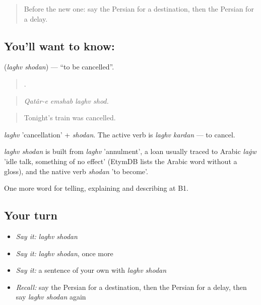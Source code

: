 \label{lesson:FA-C430-laghv-shodan}



\begin{quote}
Before the new one: say the Persian for a destination, then the Persian for a delay.
\end{quote}

\subsection*{You'll want to know:  }
\textbf{ } (\emph{laghv shodan}) — \textquotedblleft{}to be cancelled\textquotedblright{}.

\begin{quote}
   .
\end{quote}

\begin{quote}
\emph{Qatâr-e emshab laghv shod.}
\end{quote}

\begin{quote}
Tonight's train was cancelled.
\end{quote}

\emph{laghv} 'cancellation' + \emph{shodan}. The active verb is \emph{laghv kardan} — to cancel.

\begin{cousinweb}
\emph{laghv shodan} is built from \emph{laghv} 'annulment', a loan usually traced to Arabic \emph{laġw} 'idle talk, something of no effect' (EtymDB lists the Arabic word without a gloss), and the native verb \emph{shodan} 'to become'.
\end{cousinweb}

\begin{grammarlens}[title={What you've built}]
One more word for telling, explaining and describing at B1.
\end{grammarlens}

\subsection*{Your turn}
\begin{itemize}
\raggedright
  \item \emph{Say it:} \emph{laghv shodan}
  \item \emph{Say it:} \emph{laghv shodan}, once more
  \item \emph{Say it:} a sentence of your own with \emph{laghv shodan}
  \item \emph{Recall:} say the Persian for a destination, then the Persian for a delay, then say \emph{laghv shodan} again
\end{itemize}

